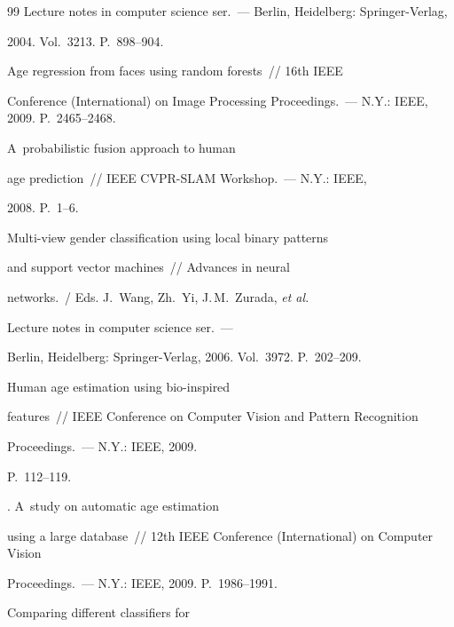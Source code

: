 {{\begin{thebibliography}{99}
Lecture notes in computer science ser.~--- Berlin, Heidelberg: Springer-Verlag,

2004. Vol.~3213. P.~898--904.




 Age regression from faces using random forests~/\!\!/ 16th IEEE

Conference (International) on Image Processing Proceedings.~--- N.Y.: IEEE, 2009. P.~2465--2468.




 A~probabilistic fusion approach to human

age prediction~/\!\!/ IEEE CVPR-SLAM Workshop.~--- N.Y.: IEEE,

2008. P.~1--6.




 Multi-view gender classification using local binary patterns

and support vector machines~/\!\!/ Advances in neural

networks.~/ Eds. J.~Wang, Zh.~Yi, J.\,M.~Zurada, \textit{et al.}

Lecture notes in computer science ser.~---

Berlin, Heidelberg: Springer-Verlag, 2006. Vol.~3972. P.~202--209.




 Human age estimation using bio-inspired

features~/\!\!/ IEEE Conference on Computer Vision and Pattern Recognition

Proceedings.~--- N.Y.: IEEE, 2009.

P.~112--119.


. A~study on automatic age estimation

using a large database~/\!\!/ 12th IEEE Conference (International) on Computer Vision

Proceedings.~---  N.Y.: IEEE, 2009. P.~1986--1991.






 Comparing different classifiers for


\end{thebibliography}}}
